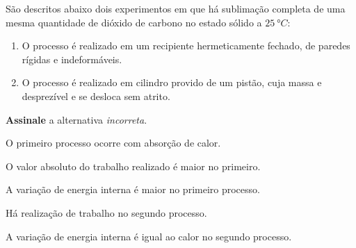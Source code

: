 \documentclass[braun, twocolumn]{braun}
\begin{document}
\begin{problem}
[2A09]São descritos abaixo dois experimentos em que há sublimação completa de
uma mesma quantidade de dióxido de carbono no estado sólido a
\(\qty{25}{\degree C}\):

\begin{enumerate}
\def\labelenumi{\arabic{enumi}.}

\item
  O processo é realizado em um recipiente hermeticamente fechado, de
  paredes rígidas e indeformáveis.
\item
  O processo é realizado em cilindro provido de um pistão, cuja massa e
  desprezível e se desloca sem atrito.
\end{enumerate}

\textbf{Assinale} a alternativa \emph{incorreta}.


\begin{choices}

\item O primeiro processo ocorre com absorção de calor.

\item O valor absoluto do trabalho realizado é maior no primeiro.

\item A variação de energia interna é maior no primeiro processo.

\item Há realização de trabalho no segundo processo.

\item A variação de energia interna é igual ao calor no segundo processo.

\end{choices}

\end{problem}
\end{document}
